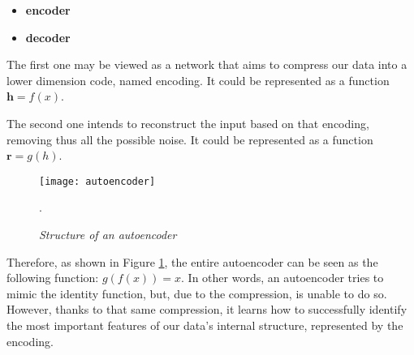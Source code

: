 \begin{itemize}
    \item \textbf{encoder}
    \item \textbf{decoder}
\end{itemize}

The first one may be viewed as a network that aims to compress
our data into a  lower dimension code, named encoding.
It could be represented as a function \(\boldsymbol{h}=f(x)\).\cite{deepLearningBook}

The second one intends to reconstruct the input based on that encoding,
removing thus all the possible noise.
It could be represented as a function \(\boldsymbol{r}=g(h)\).\cite{deepLearningBook}

\begin{figure}[h]
    \centering
    \texttt{[image: autoencoder]}
    \caption{\emph{Structure of an autoencoder \cite{deepLearningBook}}}.
    \label{fig:autoencoder}
\end{figure}

Therefore, as shown in Figure \ref{fig:autoencoder},
the entire autoencoder can be seen as the following function: \(g(f(x))=x\).
In other words, an autoencoder tries to mimic the identity function,
but, due to the compression, is unable to do so.
However, thanks to that same compression,
it learns how to successfully identify
the most important features of our data's internal structure,
represented by the encoding.\cite{deepLearningBook}


